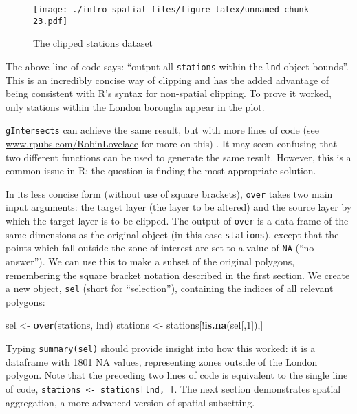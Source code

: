 \documentclass[]{article}
\newenvironment{Shaded}{}{}
\newcommand{\KeywordTok}[1]{\textcolor[rgb]{0.00,0.44,0.13}{\textbf{{#1}}}}
\newcommand{\DecValTok}[1]{\textcolor[rgb]{0.25,0.63,0.44}{{#1}}}
\newcommand{\StringTok}[1]{\textcolor[rgb]{0.25,0.44,0.63}{{#1}}}
\newcommand{\NormalTok}[1]{{#1}}
\begin{document}
\begin{figure}[htbp]
\centering
\texttt{[image: ./intro-spatial\_files/figure-latex/unnamed-chunk-23.pdf]}
\caption{The clipped stations dataset}
\end{figure}

The above line of code says: ``output all \texttt{stations} within the
\texttt{lnd} object bounds''. This is an incredibly concise way of
clipping and has the added advantage of being consistent with R's syntax
for non-spatial clipping. To prove it worked, only stations within the
London boroughs appear in the plot.

\texttt{gIntersects} can achieve the same result, but with more lines of
code (see
\href{http://www.rpubs.com/RobinLovelace/11796}{www.rpubs.com/RobinLovelace}
for more on this) . It may seem confusing that two different functions
can be used to generate the same result. However, this is a common issue
in R; the question is finding the most appropriate solution.

In its less concise form (without use of square brackets), \texttt{over}
takes two main input arguments: the target layer (the layer to be
altered) and the source layer by which the target layer is to be
clipped. The output of \texttt{over} is a data frame of the same
dimensions as the original object (in this case \texttt{stations}),
except that the points which fall outside the zone of interest are set
to a value of \texttt{NA} (``no answer''). We can use this to make a
subset of the original polygons, remembering the square bracket notation
described in the first section. We create a new object, \texttt{sel}
(short for ``selection''), containing the indices of all relevant
polygons:

\begin{Shaded}
\begin{Highlighting}[]
\NormalTok{sel <-}\StringTok{ }\KeywordTok{over}\NormalTok{(stations, lnd)}
\NormalTok{stations <-}\StringTok{ }\NormalTok{stations[!}\KeywordTok{is.na}\NormalTok{(sel[,}\DecValTok{1}\NormalTok{]),]}
\end{Highlighting}
\end{Shaded}

Typing \texttt{summary(sel)} should provide insight into how this
worked: it is a dataframe with 1801 NA values, representing zones
outside of the London polygon. Note that the preceding two lines of code
is equivalent to the single line of code,
\texttt{stations \textless{}- stations{[}lnd, {]}}. The next section
demonstrates spatial aggregation, a more advanced version of spatial
subsetting.
\end{document}
